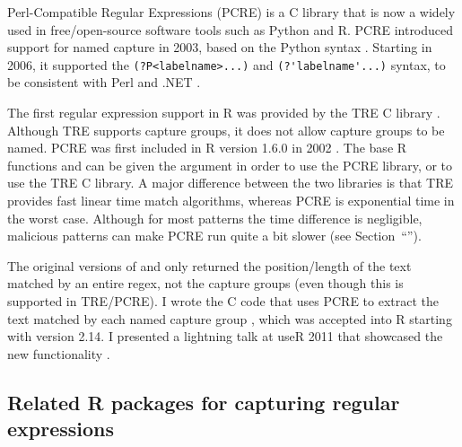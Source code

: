 Perl-Compatible Regular Expressions (PCRE) is a C library that is now
a widely used in free/open-source software tools such as Python and R.
PCRE introduced support for named capture in 2003, based on the Python
syntax \citep{pcre1-changelog.txt}. Starting in 2006, it supported the
\verb|(?P<labelname>...)| and \verb|(?'labelname'...)| syntax, to be
consistent with Perl and .NET \citep{pcre1-changelog.txt}.

The first regular expression support in R was provided by the TRE C
library \citep{TRE}. Although TRE supports capture groups, it does not
allow capture groups to be named. PCRE was first included in R version
1.6.0 in 2002 \citep{R.NEWS.1.txt}. The base R functions
 and  can be given the 
argument in order to use the PCRE library, or  to use
the TRE C library. A major difference between the two libraries is
that TRE provides fast linear time match algorithms, whereas PCRE
is exponential time in the worst case. Although for most patterns the
time difference is negligible, malicious patterns can make PCRE run
quite a bit slower (see Section~``\sectiontimings'').

The original versions of  and  only
returned the position/length of the text matched by an entire regex,
not the capture groups (even though this is supported in TRE/PCRE). I
wrote the C code that uses PCRE to extract the text matched by each
named capture group \citep{HockingBug2011}, which was accepted into R
starting with version 2.14. I presented a lightning talk at useR 2011
that showcased the new functionality \citep{HockingUseR2011}.

\subsection{Related R packages for capturing regular expressions}

